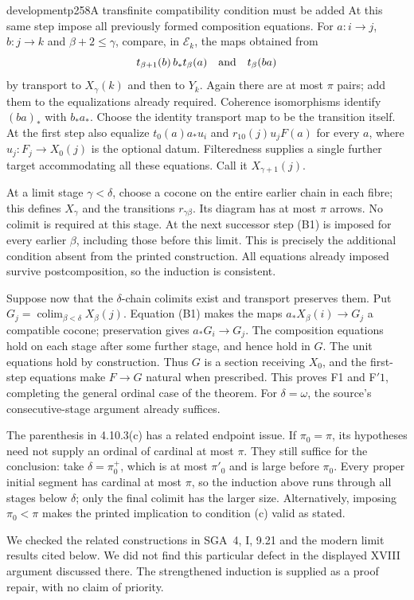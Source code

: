 \begin{dcomment}{development}{p258}{A transfinite compatibility condition must be added}
At this same step impose all previously formed composition equations. For $a:i\to j$, $b:j\to k$ and $\beta+2\leq\gamma$, compare, in $\mathcal E_k$, the maps obtained from
\[
 t_{\beta+1}(b)\,b_*t_\beta(a)
 \quad\hbox{and}\quad t_\beta(ba)
\]
by transport to $X_\gamma(k)$ and then to $Y_k$. Again there are at most $\pi$ pairs; add them to the equalizations already required. Coherence isomorphisms identify $(ba)_*$ with $b_*a_*$. Choose the identity transport map to be the transition itself. At the first step also equalize $t_0(a)a_*u_i$ and $r_{10}(j)u_jF(a)$ for every $a$, where $u_j:F_j\to X_0(j)$ is the optional datum. Filteredness supplies a single further target accommodating all these equations. Call it $X_{\gamma+1}(j)$.

At a limit stage $\gamma<\delta$, choose a cocone on the entire earlier chain in each fibre; this defines $X_\gamma$ and the transitions $r_{\gamma\beta}$. Its diagram has at most $\pi$ arrows. No colimit is required at this stage. At the next successor step (B1) is imposed for every earlier $\beta$, including those before this limit. This is precisely the additional condition absent from the printed construction. All equations already imposed survive postcomposition, so the induction is consistent.

Suppose now that the $\delta$-chain colimits exist and transport preserves them. Put $G_j=\operatorname{colim}_{\beta<\delta}X_\beta(j)$. Equation (B1) makes the maps $a_*X_\beta(i)\to G_j$ a compatible cocone; preservation gives $a_*G_i\to G_j$. The composition equations hold on each stage after some further stage, and hence hold in $G$. The unit equations hold by construction. Thus $G$ is a section receiving $X_0$, and the first-step equations make $F\to G$ natural when prescribed. This proves F1 and F$'1$, completing the general ordinal case of the theorem. For $\delta=\omega$, the source's consecutive-stage argument already suffices.

The parenthesis in 4.10.3(c) has a related endpoint issue. If $\pi_0=\pi$, its hypotheses need not supply an ordinal of cardinal at most $\pi$. They still suffice for the conclusion: take $\delta=\pi_0^+$, which is at most $\pi'_0$ and is large before $\pi_0$. Every proper initial segment has cardinal at most $\pi$, so the induction above runs through all stages below $\delta$; only the final colimit has the larger size. Alternatively, imposing $\pi_0<\pi$ makes the printed implication to condition (c) valid as stated.

We checked the related constructions in SGA~4, I, 9.21 and the modern limit results cited below. We did not find this particular defect in the displayed XVIII argument discussed there. The strengthened induction is supplied as a proof repair, with no claim of priority.
\end{dcomment}

